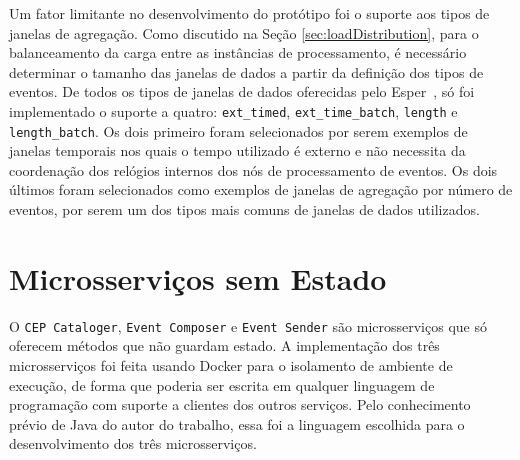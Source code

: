 Um fator limitante no desenvolvimento do protótipo foi o suporte aos tipos de janelas de agregação. Como discutido na Seção \ref{sec:loadDistribution}, para o balanceamento da carga entre as instâncias de processamento, é necessário determinar o tamanho das janelas de dados a partir da definição dos tipos de eventos. De todos os tipos de janelas de dados oferecidas pelo Esper~\citep{ESPERDataWindows}, só foi implementado o suporte a quatro: \texttt{ext\_timed}, \texttt{ext\_time\_batch}, \texttt{length} e \texttt{length\_batch}. Os dois primeiro foram selecionados por serem exemplos de janelas temporais nos quais o tempo utilizado é externo e não necessita da coordenação dos relógios internos dos nós de processamento de eventos. Os dois últimos foram selecionados como exemplos de janelas de agregação por número de eventos, por serem um dos tipos mais comuns de janelas de dados utilizados. %


\section{Microsserviços sem Estado}
O \texttt{CEP Cataloger}, \texttt{Event Composer} e \texttt{Event Sender} são microsserviços que só oferecem métodos que não guardam estado. A implementação dos três microsserviços foi feita usando Docker para o isolamento de ambiente de execução, de forma que poderia ser escrita em qualquer linguagem de programação com suporte a clientes dos outros serviços. Pelo conhecimento prévio de Java do autor do trabalho, essa foi a linguagem escolhida para o desenvolvimento dos três microsserviços.




